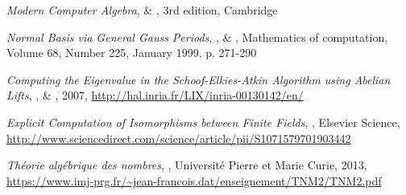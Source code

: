 \documentclass[a4paper]{article} %
\numberwithin{section}{part}
\numberwithin{equation}{section}
\begin{document}
\begin{thebibliography}{LC}
 \emph{Modern Computer Algebra},  \&
, 3rd edition, Cambridge

 \emph{Normal Basis \textup{via} General Gauss Periods},
,  \& , 
Mathematics of computation, Volume 68, Number 225, January 1999, p. 271-290

 \emph{Computing the Eigenvalue in the Schoof-Elkies-Atkin
Algorithm using Abelian Lifts}, ,  \&
, 2007, 
\url{http://hal.inria.fr/LIX/inria-00130142/en/}

 \emph{Explicit Computation of Isomorphisms between Finite
Fields}, , Elsevier Science, 
\url{http://www.sciencedirect.com/science/article/pii/S1071579701903442}

 \emph{Théorie algébrique des nombres}, ,
Université Pierre et Marie Curie, 2013, 
\url{https://www.imj-prg.fr/~jean-francois.dat/enseignement/TNM2/TNM2.pdf}

\end{thebibliography}
\end{document}
